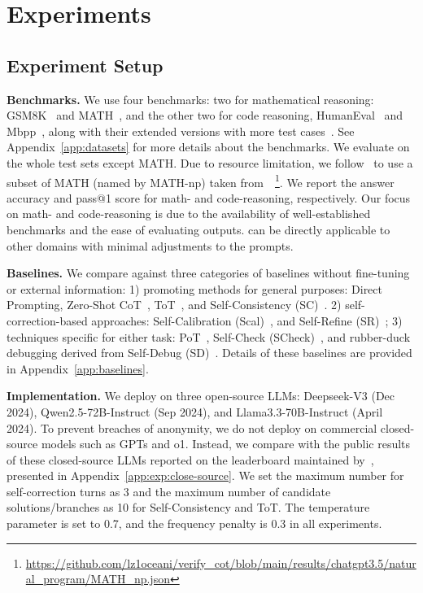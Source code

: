 \section{Experiments}
\subsection{Experiment Setup}
\noindent\textbf{Benchmarks.} We use four benchmarks: two for mathematical reasoning: GSM8K~\cite{GSM8K} and MATH~\cite{MATH}, and the other two for code reasoning, HumanEval~\cite{HumanEval} and Mbpp~\cite{Mbpp}, along with their extended versions with more test cases~\cite{EvalPlus}. 
See Appendix~\ref{app:datasets} for more details about the benchmarks.
We evaluate \tool on the whole test sets except MATH. 
Due to resource limitation, we follow~\cite{Self-Check} to use a subset of MATH (named by MATH-np) taken from~\cite{DeductiveVeriCoT}~\footnote{\url{https://github.com/lz1oceani/verify_cot/blob/main/results/chatgpt3.5/natural_program/MATH_np.json}}.
We report the answer accuracy and pass@1 score for math- and code-reasoning, respectively.
Our focus on math- and code-reasoning is due to the availability of well-established benchmarks and the ease of evaluating outputs. \tool can be directly applicable to other domains with minimal adjustments to the prompts.

\noindent\textbf{Baselines.} We compare \tool against three categories of baselines without fine-tuning or external information: 
1) promoting methods for general purposes: Direct Prompting, Zero-Shot CoT~\cite{CoT}, ToT~\cite{ToT}, and Self-Consistency (SC)~\cite{Self-Consistency}.
2) self-correction-based approaches: Self-Calibration (Scal)~\cite{Self-Calibration}, and Self-Refine (SR)~\cite{Self-Refine};
3) techniques specific for either task: PoT~\cite{PoT}, Self-Check (SCheck)~\cite{Self-Check}, and rubber-duck debugging derived from Self-Debug (SD)~\cite{Self-Debug}.
Details of these baselines are provided in Appendix~\ref{app:baselines}.


\noindent\textbf{Implementation.} We deploy \tool on three open-source LLMs: Deepseek-V3 (Dec 2024), Qwen2.5-72B-Instruct (Sep 2024), and Llama3.3-70B-Instruct (April 2024). 
To prevent breaches of anonymity, we do not deploy \tool on commercial closed-source models such as GPTs and o1. Instead, we compare \tool with the public results of these closed-source LLMs reported on the leaderboard maintained by~\cite{EvalPlus, GSM8KLead, GSM8KSymbolic}, presented in Appendix~\ref{app:exp:close-source}.
We set the maximum number for self-correction turns as 3 and the maximum number of candidate solutions/branches as 10 for Self-Consistency and ToT. The temperature parameter is set to 0.7, and the frequency penalty is 0.3 in all experiments.

